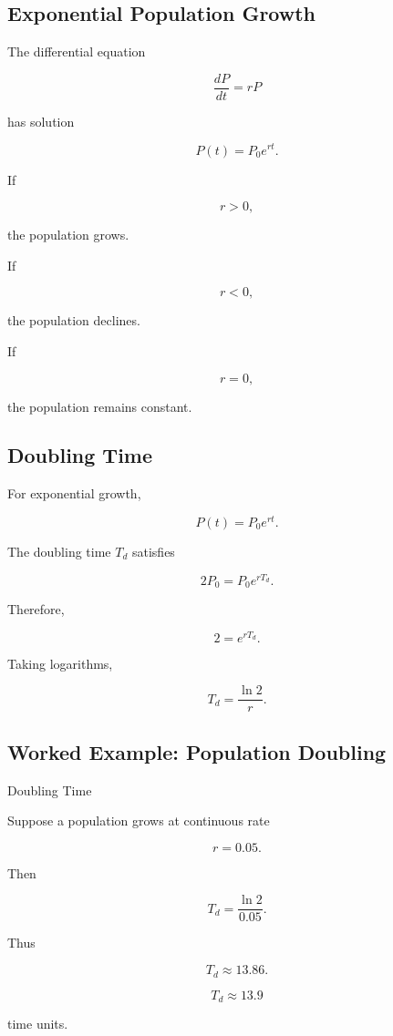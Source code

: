 \subsection{Exponential Population Growth}
\label{subsec:exponential-population-growth}

The differential equation

\[
\frac{dP}{dt}=rP
\]

has solution

\[
\boxed{
P(t)=P_0e^{rt}.
}
\]

If

\[
r>0,
\]

the population grows.

If

\[
r<0,
\]

the population declines.

If

\[
r=0,
\]

the population remains constant.

\subsection{Doubling Time}
\label{subsec:population-doubling-time}

For exponential growth,

\[
P(t)=P_0e^{rt}.
\]

The doubling time \(T_d\) satisfies

\[
2P_0
=
P_0e^{rT_d}.
\]

Therefore,

\[
2=e^{rT_d}.
\]

Taking logarithms,

\[
\boxed{
T_d
=
\frac{\ln2}{r}.
}
\]

\subsection{Worked Example: Population Doubling}
\label{subsec:worked-population-doubling}

\begin{workedexamplebox}{Doubling Time}

Suppose a population grows at continuous rate

\[
r=0.05.
\]

Then

\[
T_d
=
\frac{\ln2}{0.05}.
\]

Thus

\[
T_d
\approx
13.86.
\]

\begin{answerbox}
\[
\boxed{
T_d\approx13.9
}
\]

time units.
\end{answerbox}

\end{workedexamplebox}

